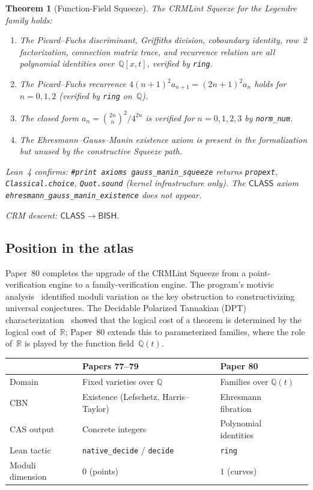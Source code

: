 \documentclass[11pt]{article}
\theoremstyle{plain}
\newtheorem{theorem}{Theorem}[section]
\theoremstyle{definition}
\theoremstyle{remark}
\newcommand{\Q}{\mathbb{Q}}
\newcommand{\R}{\mathbb{R}}
\newcommand{\BISH}{\mathsf{BISH}}
\newcommand{\CLASS}{\mathsf{CLASS}}
\begin{document}
\begin{theorem}[Function-Field Squeeze]\label{thm:C}
The CRMLint Squeeze for the Legendre family holds:
\begin{enumerate}[nosep,label=(\alph*)]
\item The Picard--Fuchs discriminant, Griffiths division,
  coboundary identity, row~2 factorization,
  connection matrix trace, and recurrence relation are all
  polynomial identities over~$\Q[x, t]$, verified by \texttt{ring}.
\item The Picard--Fuchs recurrence $4(n+1)^2 a_{n+1} = (2n+1)^2 a_n$
  holds for $n = 0, 1, 2$ (verified by \texttt{ring} on~$\Q$).
\item The closed form $a_n = \binom{2n}{n}^2 / 4^{2n}$ is verified
  for $n = 0, 1, 2, 3$ by \texttt{norm\_num}.
\item The Ehresmann--Gauss--Manin existence axiom is present in the
  formalization but unused by the constructive Squeeze path.
\end{enumerate}
Lean~4 confirms: \texttt{\#print axioms gauss\_manin\_squeeze} returns
\texttt{propext}, \texttt{Classical.choice}, \texttt{Quot.sound}
(kernel infrastructure only).  The $\CLASS$ axiom
\texttt{ehresmann\_gauss\_manin\_existence} does not appear.

CRM descent: $\CLASS \to \BISH$.
\end{theorem}

\subsection{Position in the atlas}

Paper~80 completes the upgrade of the CRMLint Squeeze from a
point-verification engine to a family-verification engine.  The
program's motivic analysis~\cite{Paper50} identified moduli
variation as the key obstruction to constructivizing universal
conjectures.  The Decidable Polarized Tannakian (DPT)
characterization~\cite{Paper72} showed that
the logical cost of a theorem is determined by the logical cost
of~$\R$; Paper~80 extends this to parameterized families, where
the role of~$\R$ is played by the function field~$\Q(t)$.

\begin{center}
\begin{tabular}{llll}
\toprule
& \textbf{Papers 77--79} & \textbf{Paper 80} \\
\midrule
Domain & Fixed varieties over $\Q$ & Families over $\Q(t)$ \\
CBN & Existence (Lefschetz, Harris--Taylor) & Ehresmann fibration \\
CAS output & Concrete integers & Polynomial identities \\
Lean tactic & \texttt{native\_decide} / \texttt{decide} & \texttt{ring} \\
Moduli dimension & $0$ (points) & $1$ (curves) \\
\bottomrule
\end{tabular}
\end{center}
\end{document}

